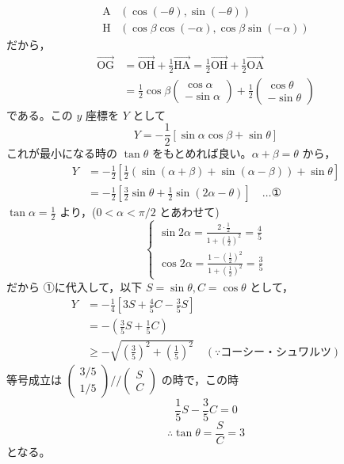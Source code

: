 \documentclass[../main.tex]{subfiles}
\begin{document}
\begin{align*}
  \mathrm{A}&(\cos(-\theta), \sin(-\theta)) \\
  \mathrm{H}&(\cos\beta \cos(-\alpha), \cos\beta \sin(-\alpha))
\end{align*}
だから，
\begin{align*}
  \vec{\mathrm{OG}} &= \vec{\mathrm{OH}} + \frac{1}{2}\vec{\mathrm{HA}} = \frac{1}{2}\vec{\mathrm{OH}} + \frac{1}{2}\vec{\mathrm{OA}} \\
  &= \frac{1}{2} \cos\beta
  \begin{pmatrix} \cos\alpha \\ -\sin\alpha
  \end{pmatrix} + \frac{1}{2}
  \begin{pmatrix} \cos\theta \\ -\sin\theta
  \end{pmatrix}
\end{align*}
である。この $y$ 座標を $Y$ として
\[
  Y = -\frac{1}{2} [ \sin\alpha \cos\beta + \sin\theta ]
\]
これが最小になる時の $\tan\theta$ をもとめれば良い。$\alpha + \beta = \theta$ から，
\begin{align*}
  Y &= -\frac{1}{2} \left[ \frac{1}{2}(\sin(\alpha+\beta) + \sin(\alpha-\beta)) + \sin\theta \right] \\
  &= -\frac{1}{2} \left[ \frac{3}{2}\sin\theta + \frac{1}{2}\sin(2\alpha-\theta) \right] \quad \dots \text{①}
\end{align*}
$\tan\alpha = \frac{1}{2}$ より，($0 < \alpha < \pi/2$ とあわせて)
\[
  \begin{cases}
    \sin 2\alpha = \frac{2 \cdot \frac{1}{2}}{1 + (\frac{1}{2})^2} = \frac{4}{5} \\[1ex]
    \cos 2\alpha = \frac{1 - (\frac{1}{2})^2}{1 + (\frac{1}{2})^2} = \frac{3}{5}
  \end{cases}
\]
だから ①に代入して，以下 $S = \sin\theta, C = \cos\theta$ として，
\begin{align*}
  Y &= -\frac{1}{4} \left[ 3S + \frac{4}{5}C - \frac{3}{5}S \right] \\
  &= -\left( \frac{3}{5}S + \frac{1}{5}C \right) \\
  &\ge -\sqrt{\left(\frac{3}{5}\right)^2 + \left(\frac{1}{5}\right)^2} \quad (\because \text{コーシー・シュワルツ})
\end{align*}
等号成立は $
\begin{pmatrix} 3/5 \\ 1/5
\end{pmatrix} \mathbin{/\!/}
\begin{pmatrix} S \\ C
\end{pmatrix}$ の時で，この時
\[
  \frac{1}{5}S - \frac{3}{5}C = 0
\]
\[
  \therefore \tan\theta = \frac{S}{C} = 3
\]
となる。
\end{document}

